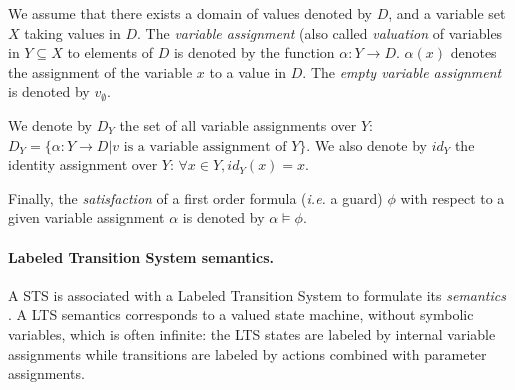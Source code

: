 \begin{definition}
    We assume that there exists a domain of values denoted by
    $D$, and a variable set $X$ taking values in $D$. The
    \emph{variable assignment} (also called \emph{valuation} of
    variables in $Y \subseteq X$ to elements of $D$ is denoted by
    the function $\alpha: Y \rightarrow D$.  $\alpha(x)$ denotes
    the assignment of the variable $x$ to a value in $D$.
    The \emph{empty variable assignment} is denoted by $v_\emptyset$.

    We denote by $D_Y$ the set of all variable assignments over
    $Y$: $D_Y = \{ \alpha : Y \rightarrow D | v \text{ is a
    variable assignment of } Y \}$. We also denote by $id_Y$ the
    identity assignment over $Y$: $\forall x \in Y, id_Y(x)
    = x$.

    Finally, the \emph{satisfaction} of a first order formula
    \cite{huth2004logic} (\emph{i.e.} a guard) $\phi$ with
    respect to a given variable assignment $\alpha$ is denoted by
    $\alpha \models \phi$.
\end{definition}

\paragraph{Labeled Transition System semantics.}
\label{sec:definitions:lts-semantics}

A STS is associated with a Labeled Transition System to formulate
its \emph{semantics} \cite{FTW05}. A LTS semantics corresponds to
a valued state machine, without symbolic variables, which is
often infinite: the LTS states are labeled by internal variable
assignments while transitions are labeled by actions combined
with parameter assignments.

